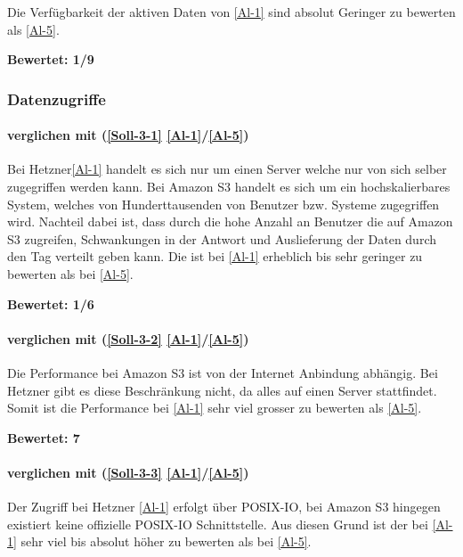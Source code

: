 Die  Verfügbarkeit der aktiven Daten von \ref{Al-1} sind absolut Geringer zu bewerten als \ref{Al-5}.

\textbf{Bewertet: 1/9}

\subsubsection{Datenzugriffe}

\paragraph*{  verglichen mit  (\ref{Soll-3-1} \ref{Al-1}/\ref{Al-5})}
Bei Hetzner\ref{Al-1} handelt es sich nur um einen Server welche nur von sich selber zugegriffen werden kann. Bei Amazon S3 handelt es sich um ein hochskalierbares System, welches von Hunderttausenden von Benutzer bzw. Systeme zugegriffen wird. Nachteil dabei ist, dass durch die hohe Anzahl an Benutzer die auf Amazon S3 zugreifen, Schwankungen in der Antwort und Auslieferung der Daten durch den Tag verteilt geben kann.
Die  ist bei \ref{Al-1} erheblich bis sehr geringer zu bewerten als bei \ref{Al-5}.

\textbf{Bewertet: 1/6}

\paragraph*{  verglichen mit  (\ref{Soll-3-2} \ref{Al-1}/\ref{Al-5})}
Die Performance bei Amazon S3 ist von der Internet Anbindung abhängig. Bei Hetzner gibt es diese Beschränkung nicht, da alles auf einen Server stattfindet. Somit ist die Performance bei  \ref{Al-1} sehr viel grosser zu bewerten als  \ref{Al-5}.

\textbf{Bewertet: 7} 

\paragraph*{  verglichen mit  (\ref{Soll-3-3} \ref{Al-1}/\ref{Al-5})}
Der Zugriff bei Hetzner \ref{Al-1} erfolgt über POSIX-IO, bei Amazon S3 hingegen existiert keine offizielle POSIX-IO Schnittstelle. Aus diesen Grund ist der  bei  \ref{Al-1} sehr viel bis absolut höher zu bewerten als bei  \ref{Al-5}.

